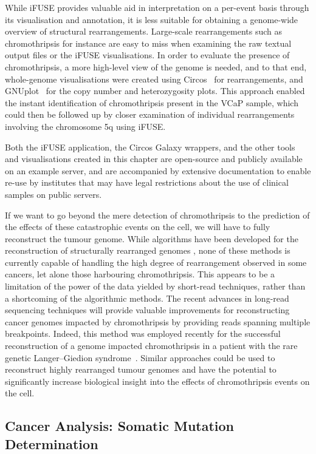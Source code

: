 While iFUSE provides valuable aid in interpretation on a per-event basis through its visualisation and annotation, it is less suitable for obtaining a genome-wide overview of structural rearrangements. Large-scale rearrangements such as chromothripsis for instance are easy to miss when examining the raw textual output files or the iFUSE visualisations. In order to evaluate the presence of chromothripsis, a more high-level view of the genome is needed, and to that end, whole-genome visualisations were created using Circos~\cite{circos} for rearrangements, and GNUplot~\cite{url-gnuplot} for the copy number and heterozygosity plots. This approach enabled the instant identification of chromothripsis present in the VCaP sample, which could then be followed up by closer examination of individual rearrangements involving the chromosome 5q using iFUSE.

Both the iFUSE application, the Circos Galaxy wrappers, and the other tools and visualisations created in this chapter are open-source and publicly available on an example server, and are accompanied by extensive documentation to enable re-use by institutes that may have legal restrictions about the use of clinical samples on public servers.

If we want to go beyond the mere detection of chromothripsis to the prediction of the effects of these catastrophic events on the cell, we will have to fully reconstruct the tumour genome.
While algorithms have been developed for the reconstruction of structurally rearranged genomes \cite{prego,Baca2013}, none of these methods is currently capable of handling the high degree of rearrangement observed in some cancers, let alone those harbouring chromothripsis.
This appears to be a limitation of the power of the data yielded by short-read techniques, rather than a shortcoming of the algorithmic methods.
The recent advances in long-read sequencing techniques will provide valuable improvements for reconstructing cancer genomes impacted by chromothripsis by providing reads spanning multiple breakpoints.
Indeed, this method was employed recently for the successful reconstruction of a genome impacted chromothripsis in a patient with the rare genetic Langer–Giedion syndrome~\cite{lei2020long}.
Similar approaches could be used to reconstruct highly rearranged tumour genomes and have the potential to significantly increase biological insight into the effects of chromothripsis events on the cell.

\subsection{Cancer Analysis: Somatic Mutation Determination}
